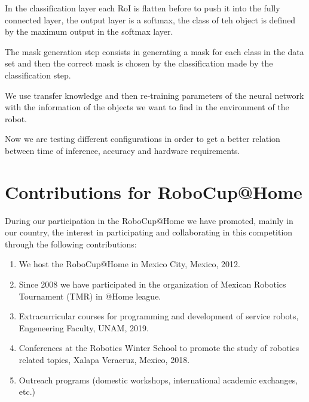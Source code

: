 \documentclass{llncs}
\begin{document}
In the classification layer each RoI is flatten before to push it into the fully connected layer, the output layer is a softmax, the class of teh object is defined by the maximum output in the softmax layer. 

The mask generation step consists in generating a mask for each class in the data set and then the correct mask is chosen by the classification made by the classification step.

We use transfer knowledge and then re-training parameters of the neural network with the information of the objects we want to find in the environment of the robot.

Now we are testing different configurations in order to get a better relation between time of inference, accuracy and hardware requirements.




\section{Contributions for RoboCup@Home}\label{sec:contributions}
During our participation in the RoboCup@Home we have promoted, mainly in our country, 
the interest in participating and collaborating in this competition through the following contributions:

\begin{enumerate}
	\item We host the RoboCup@Home in Mexico City, Mexico, 2012.
	\item Since 2008 we have participated in the organization of Mexican Robotics Tournament (TMR) in @Home league.
	\item Extracurricular courses for programming and development of service robots, Engeneering Faculty, UNAM, 2019.
	\item Conferences at the Robotics Winter School to promote the study of robotics related topics, Xalapa Veracruz, Mexico, 2018.
	\item Outreach programs (domestic workshops, international academic exchanges, etc.) 
\end{enumerate}



\end{document}
